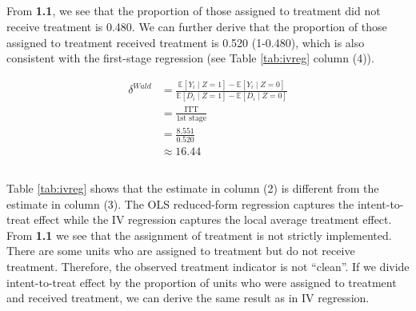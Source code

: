 \documentclass[a4paper]{article}
\begin{document}
\subsection{} %

From \textbf{1.1}, we see that the proportion of those assigned to treatment did not receive treatment is 0.480. We can further derive that the proportion of those assigned to treatment received treatment is 0.520 (1-0.480), which is also consistent with the first-stage regression (see Table \ref{tab:ivreg} column (4)).

\begin{align*}
    \delta^{Wald}&=\frac{\mathbb{E}[Y_i\mid Z=1] - \mathbb{E}[Y_i\mid Z=0]}
    {\mathbb{E}[D_i\mid Z=1] - \mathbb{E}[D_i\mid Z=0]} \\
    &=\frac{\textrm{ITT}}{\textrm{1st stage}} \\
    &=\frac{8.551}{0.520} \\
    &\approx16.44
\end{align*}

\subsection{}

Table \ref{tab:ivreg} shows that the estimate in column (2) is different from the estimate in column (3). The OLS reduced-form regression captures the intent-to-treat effect while the IV regression captures the local average treatment effect. From \textbf{1.1} we see that the assignment of treatment is not strictly implemented. There are some units who are assigned to treatment but do not receive treatment. Therefore, the observed treatment indicator is not ``clean''.  If we divide intent-to-treat effect by the proportion of units who were assigned to treatment and received treatment, we can derive the same result as in IV regression.

\end{document}
